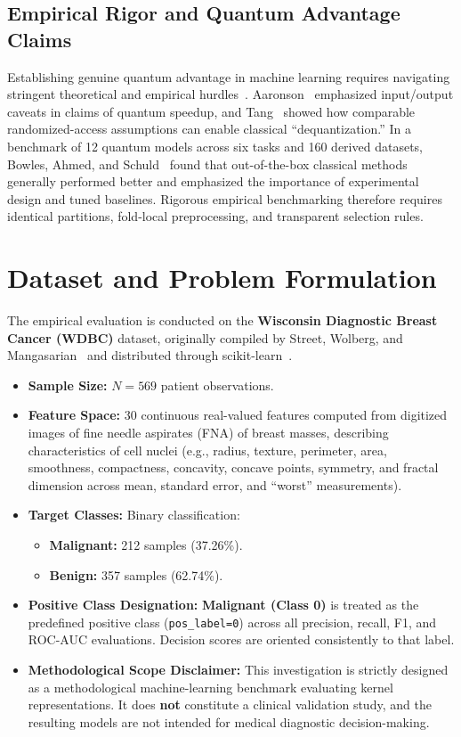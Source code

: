 \documentclass[12pt,a4paper]{article}
\begin{document}
\subsection{Empirical Rigor and Quantum Advantage Claims}
Establishing genuine quantum advantage in machine learning requires navigating stringent theoretical and empirical hurdles~\cite{cerezo2022challenges, preskill2018quantum}. Aaronson~\cite{aaronson2015read} emphasized input/output caveats in claims of quantum speedup, and Tang~\cite{tang2019quantum} showed how comparable randomized-access assumptions can enable classical ``dequantization.'' In a benchmark of 12 quantum models across six tasks and 160 derived datasets, Bowles, Ahmed, and Schuld~\cite{bowles2024better} found that out-of-the-box classical methods generally performed better and emphasized the importance of experimental design and tuned baselines. Rigorous empirical benchmarking therefore requires identical partitions, fold-local preprocessing, and transparent selection rules.

\section{Dataset and Problem Formulation}
The empirical evaluation is conducted on the \textbf{Wisconsin Diagnostic Breast Cancer (WDBC)} dataset, originally compiled by Street, Wolberg, and Mangasarian~\cite{street1993nuclear} and distributed through scikit-learn~\cite{pedregosa2011scikit}.
\begin{itemize}
    \item \textbf{Sample Size:} $N = 569$ patient observations.
    \item \textbf{Feature Space:} 30 continuous real-valued features computed from digitized images of fine needle aspirates (FNA) of breast masses, describing characteristics of cell nuclei (e.g., radius, texture, perimeter, area, smoothness, compactness, concavity, concave points, symmetry, and fractal dimension across mean, standard error, and ``worst'' measurements).
    \item \textbf{Target Classes:} Binary classification:
    \begin{itemize}
        \item \textbf{Malignant:} 212 samples (37.26\%).
        \item \textbf{Benign:} 357 samples (62.74\%).
    \end{itemize}
    \item \textbf{Positive Class Designation:} \textbf{Malignant (Class 0)} is treated as the predefined positive class (\texttt{pos\_label=0}) across all precision, recall, F1, and ROC-AUC evaluations. Decision scores are oriented consistently to that label.
    \item \textbf{Methodological Scope Disclaimer:} This investigation is strictly designed as a methodological machine-learning benchmark evaluating kernel representations. It does \textbf{not} constitute a clinical validation study, and the resulting models are not intended for medical diagnostic decision-making.
\end{itemize}
\end{document}
